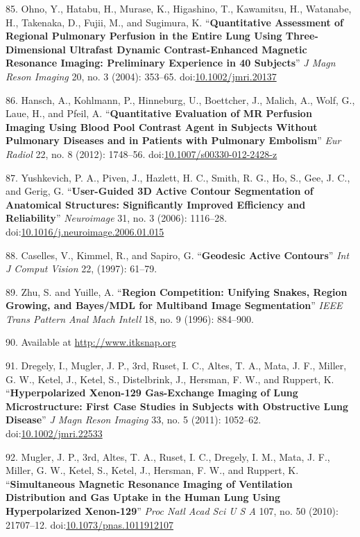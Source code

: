 \documentclass[11pt,]{article}
\begin{document}
\hypertarget{ref-Ohno:2004aa}{}
85. Ohno, Y., Hatabu, H., Murase, K., Higashino, T., Kawamitsu, H.,
Watanabe, H., Takenaka, D., Fujii, M., and Sugimura, K.
``\textbf{Quantitative Assessment of Regional Pulmonary Perfusion in the
Entire Lung Using Three-Dimensional Ultrafast Dynamic Contrast-Enhanced
Magnetic Resonance Imaging: Preliminary Experience in 40 Subjects}''
\emph{J Magn Reson Imaging} 20, no. 3 (2004): 353--65.
doi:\href{https://doi.org/10.1002/jmri.20137}{10.1002/jmri.20137}

\hypertarget{ref-Hansch:2012aa}{}
86. Hansch, A., Kohlmann, P., Hinneburg, U., Boettcher, J., Malich, A.,
Wolf, G., Laue, H., and Pfeil, A. ``\textbf{Quantitative Evaluation of
MR Perfusion Imaging Using Blood Pool Contrast Agent in Subjects Without
Pulmonary Diseases and in Patients with Pulmonary Embolism}'' \emph{Eur
Radiol} 22, no. 8 (2012): 1748--56.
doi:\href{https://doi.org/10.1007/s00330-012-2428-z}{10.1007/s00330-012-2428-z}

\hypertarget{ref-Yushkevich:2006aa}{}
87. Yushkevich, P. A., Piven, J., Hazlett, H. C., Smith, R. G., Ho, S.,
Gee, J. C., and Gerig, G. ``\textbf{User-Guided 3D Active Contour
Segmentation of Anatomical Structures: Significantly Improved Efficiency
and Reliability}'' \emph{Neuroimage} 31, no. 3 (2006): 1116--28.
doi:\href{https://doi.org/10.1016/j.neuroimage.2006.01.015}{10.1016/j.neuroimage.2006.01.015}

\hypertarget{ref-Caselles:1997aa}{}
88. Caselles, V., Kimmel, R., and Sapiro, G. ``\textbf{Geodesic Active
Contours}'' \emph{Int J Comput Vision} 22, (1997): 61--79.

\hypertarget{ref-Zhu:1996aa}{}
89. Zhu, S. and Yuille, A. ``\textbf{Region Competition: Unifying
Snakes, Region Growing, and Bayes/MDL for Multiband Image
Segmentation}'' \emph{IEEE Trans Pattern Anal Mach Intell} 18, no. 9
(1996): 884--900.

\hypertarget{ref-SnapWebsite}{}
90. Available at \url{http://www.itksnap.org}

\hypertarget{ref-Dregely:2011aa}{}
91. Dregely, I., Mugler, J. P., 3rd, Ruset, I. C., Altes, T. A., Mata,
J. F., Miller, G. W., Ketel, J., Ketel, S., Distelbrink, J., Hersman, F.
W., and Ruppert, K. ``\textbf{Hyperpolarized Xenon-129 Gas-Exchange
Imaging of Lung Microstructure: First Case Studies in Subjects with
Obstructive Lung Disease}'' \emph{J Magn Reson Imaging} 33, no. 5
(2011): 1052--62.
doi:\href{https://doi.org/10.1002/jmri.22533}{10.1002/jmri.22533}

\hypertarget{ref-Mugler:2010aa}{}
92. Mugler, J. P., 3rd, Altes, T. A., Ruset, I. C., Dregely, I. M.,
Mata, J. F., Miller, G. W., Ketel, S., Ketel, J., Hersman, F. W., and
Ruppert, K. ``\textbf{Simultaneous Magnetic Resonance Imaging of
Ventilation Distribution and Gas Uptake in the Human Lung Using
Hyperpolarized Xenon-129}'' \emph{Proc Natl Acad Sci U S A} 107, no. 50
(2010): 21707--12.
doi:\href{https://doi.org/10.1073/pnas.1011912107}{10.1073/pnas.1011912107}
\end{document}
